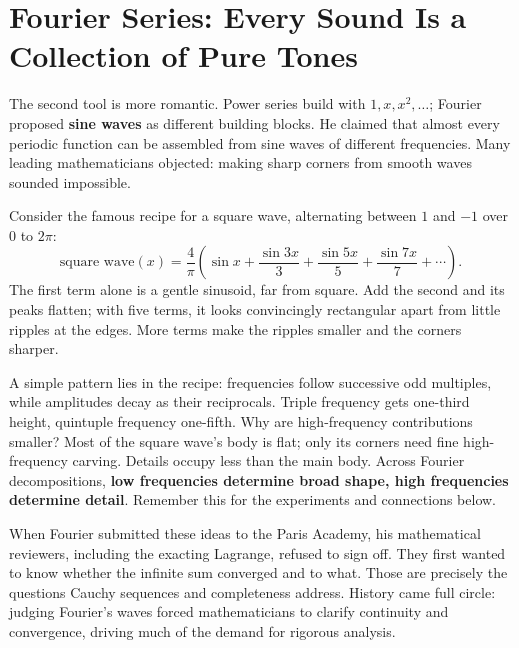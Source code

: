 \section{Fourier Series: Every Sound Is a Collection of Pure Tones}

The second tool is more romantic. Power series build with $1,x,x^2,\dots$; Fourier proposed \textbf{sine waves} as different building blocks. He claimed that almost every periodic function can be assembled from sine waves of different frequencies. Many leading mathematicians objected: making sharp corners from smooth waves sounded impossible.

Consider the famous recipe for a square wave, alternating between $1$ and $-1$ over $0$ to $2\pi$:
\[
\text{square wave}(x)=\frac{4}{\pi}\left(\sin x+\frac{\sin 3x}{3}+\frac{\sin 5x}{5}+\frac{\sin 7x}{7}+\cdots\right).
\]
The first term alone is a gentle sinusoid, far from square. Add the second and its peaks flatten; with five terms, it looks convincingly rectangular apart from little ripples at the edges. More terms make the ripples smaller and the corners sharper.

A simple pattern lies in the recipe: frequencies follow successive odd multiples, while amplitudes decay as their reciprocals. Triple frequency gets one-third height, quintuple frequency one-fifth. Why are high-frequency contributions smaller? Most of the square wave's body is flat; only its corners need fine high-frequency carving. Details occupy less than the main body. Across Fourier decompositions, \textbf{low frequencies determine broad shape, high frequencies determine detail}. Remember this for the experiments and connections below.

When Fourier submitted these ideas to the Paris Academy, his mathematical reviewers, including the exacting Lagrange, refused to sign off. They first wanted to know whether the infinite sum converged and to what. Those are precisely the questions Cauchy sequences and completeness address. History came full circle: judging Fourier's waves forced mathematicians to clarify continuity and convergence, driving much of the demand for rigorous analysis.

\begin{center}
\end{center}

